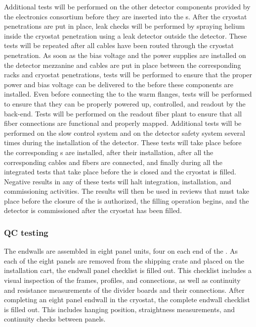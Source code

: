 Additional tests will be performed on the other detector components
provided by the  electronics consortium before they are inserted into the
s. After the cryostat penetrations are put in place, leak checks
will be performed by spraying helium inside the cryostat penetration using 
a leak detector outside the detector. These tests will be repeated 
after all cables have been routed through the cryostat penetration.
As soon as the bias voltage and the power supplies are installed on the detector
mezzanine and cables are put in place between the corresponding racks and
cryostat penetrations, tests will be performed to ensure that the proper 
power and bias voltage can be delivered to the  before these components
are installed. Even before connecting the  to the warm flanges,
tests will be performed to ensure that they can be properly powered up, controlled,
and readout by the  back-end. Tests will be performed on the
readout fiber plant to ensure that all fiber connections are functional
and properly mapped. Additional tests will be performed on the slow control
system and on the detector safety system several times during the
installation of the detector. These tests will take place before the
corresponding s are installed, after their installation, after
all the corresponding cables and fibers are connected, and finally
during all the integrated tests that take place before
the  is closed and the cryostat is filled. Negative results in any
of these tests will halt integration, installation, and
commissioning activities. The results will then be used in reviews that must
take place before the closure of the  is authorized, the  filling operation begins, and the detector is
commissioned after the cryostat has been filled.

\subsubsection{ QC testing}

The endwalls are assembled in eight panel units, four on each end of the .  
As each of the eight panels are removed from the shipping crate and placed on the installation cart, the endwall panel checklist is filled out.\cite{bib:docdb10452}
This checklist includes a visual inspection of the frames, profiles, and connections, as well as continuity and resistance measurements of the divider boards and their connections.  
After completing an eight panel endwall in the cryostat, the complete endwall checklist is filled out.  
This includes hanging position, straightness measurements, and continuity checks between panels.

